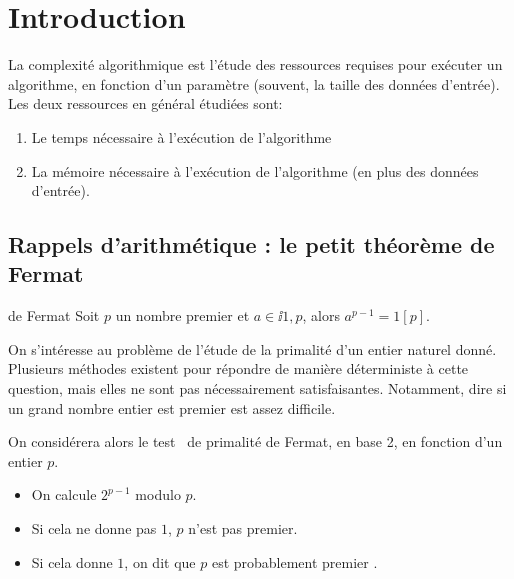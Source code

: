 \section{Introduction}

\begin{defi}[Complexité]
  La complexité algorithmique est l'étude des ressources requises pour
  exécuter un algorithme, en fonction d'un paramètre (souvent, la
  taille des données d'entrée). Les deux
  ressources en général étudiées sont:
  \begin{enumerate}
  \item Le temps nécessaire à l'exécution de l'algorithme
  \item La mémoire nécessaire à l'exécution de l'algorithme (en plus
    des données d'entrée).
  \end{enumerate}
\end{defi}


%

\subsection{Rappels d'arithmétique : le petit théorème de Fermat}

\begin{theorem}{de Fermat}
  Soit $p$ un nombre premier et $a \in \ii{1,p}$, alors $a^{p-1} = 1 [p]$.
\end{theorem}

On s'intéresse au problème de l'étude de la primalité d'un entier naturel donné. 
Plusieurs méthodes existent pour répondre de manière déterministe à cette question, mais elles ne sont pas nécessairement satisfaisantes. 
Notamment, dire si un grand nombre entier est premier est assez difficile. 

On considérera alors le \og test \fg\ de primalité de Fermat, en base 2, en fonction d'un entier $p$.
\begin{itemize}
  \item On calcule $2^{p-1}$ modulo $p$. 
  \item Si cela ne donne pas $1$, $p$ n'est pas premier. 
  \item Si cela donne $1$, on dit que \og $p$ est probablement premier \fg.
\end{itemize}

